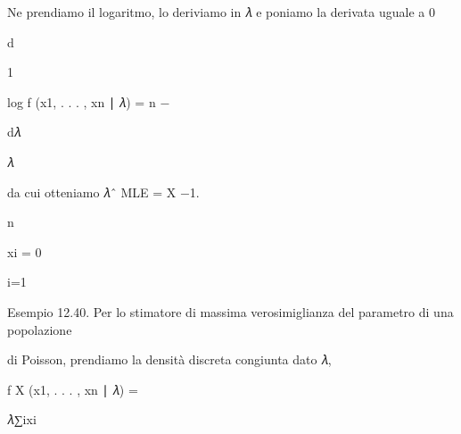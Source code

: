 \documentclass[a4paper,portrait,12pt]{article}
\begin{document}
\begin{flushleft}
Ne prendiamo il logaritmo, lo deriviamo in 𝜆 e poniamo la derivata uguale a 0
\end{flushleft}


\begin{flushleft}
d
\end{flushleft}


1


\begin{flushleft}
log f (x1, . . . , xn ∣ 𝜆) = n $-$
\end{flushleft}


\begin{flushleft}
d𝜆
\end{flushleft}


\begin{flushleft}
𝜆
\end{flushleft}


\begin{flushleft}
da cui otteniamo 𝜆ˆ MLE = X $-$1.
\end{flushleft}





\begin{flushleft}
n
\end{flushleft}





\begin{flushleft}
xi = 0
\end{flushleft}


\begin{flushleft}
i=1
\end{flushleft}





\begin{flushleft}
Esempio 12.40. Per lo stimatore di massima verosimiglianza del parametro di una popolazione
\end{flushleft}


\begin{flushleft}
di Poisson, prendiamo la densit\`{a} discreta congiunta dato 𝜆,
\end{flushleft}


\begin{flushleft}
f X (x1, . . . , xn ∣ 𝜆) =
\end{flushleft}





\begin{flushleft}
𝜆∑ixi
\end{flushleft}
\end{document}
